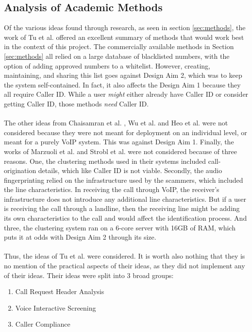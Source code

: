 \documentclass[main.tex]{subfiles}
\begin{document}
\subsection{Analysis of Academic Methods}
Of the various ideas found through research, as seen in section \ref{sec:methods}, the work of Tu et al. \cite{cisco} offered an excellent summary of methods that would work best in the context of this project. The commercially available methods in Section \ref{sec:methods} all relied on a large database of blacklisted numbers, with the option of adding approved numbers to a whitelist. However, creating, maintaining, and sharing this list goes against Design Aim 2, which was to keep the system self-contained. In fact, it also affects the Design Aim 1 because they all require Caller ID. While a user \textit{might} either already have Caller ID or consider getting Caller ID, those methods \textit{need} Caller ID.
\\\\
The other ideas from Chaisamran et al. \cite{chaisa}, Wu et al. \cite{wu} and Heo et al. \cite{heo} were not considered because they were not meant for deployment on an individual level, or meant for a purely VoIP system. This was against Design Aim 1. Finally, the works of Marzuoli et al. \cite{marzuoli} and Strobl et al. \cite{strobl} were not considered because of three reasons. One, the clustering methods used in their systems included call-origination details, which like Caller ID is not viable. Secondly, the audio fingerprinting relied on the infrastructure used by the scammers, which included the line characteristics. In receiving the call through VoIP, the receiver's infrastructure does not introduce any additional line characteristics. But if a user is receiving the call through a landline, then the receiving line might be adding its own characteristics to the call and would affect the identification process. And three, the clustering system ran on a 6-core server with 16GB of RAM, which puts it at odds with Design Aim 2 through its size.
\\\\
Thus, the ideas of Tu et al. were considered. It is worth also nothing that they is no mention of the practical aspects of their ideas, as they did not implement any of their ideas. Their ideas were split into 3 broad groups: \begin{enumerate}
	\item Call Request Header Analysis
	\item Voice Interactive Screening
	\item Caller Compliance
\end{enumerate}
\end{document}
